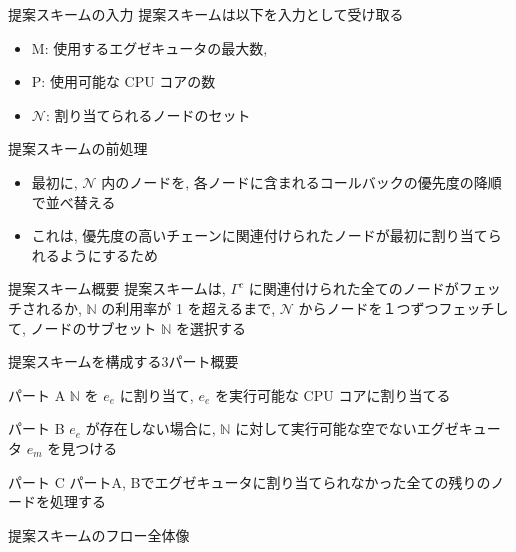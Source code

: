 \begin{frame}{提案スキームの入力}
    提案スキームは以下を入力として受け取る
    \begin{itemize}
        \item $\mathrm{M}$: 使用するエグゼキュータの最大数,
        \item $\mathrm{P}$: 使用可能な CPU コアの数
        \item $\mathcal{N}$: 割り当てられるノードのセット
    \end{itemize}
\end{frame}

\begin{frame}{提案スキームの前処理}
    \begin{itemize}
        \item 最初に, $\mathcal{N}$ 内のノードを, 各ノードに含まれるコールバックの優先度の降順で並べ替える
        \item これは, 優先度の高いチェーンに関連付けられたノードが最初に割り当てられるようにするため
    \end{itemize}
\end{frame}

\begin{frame}{提案スキーム概要}
    提案スキームは, $\Gamma^{c}$ に関連付けられた全てのノードがフェッチされるか, $\mathbb{N}$ の利用率が 1 を超えるまで, $\mathcal{N}$ からノードを１つずつフェッチして, ノードのサブセット $\mathbb{N}$ を選択する
\end{frame}

\begin{frame}{提案スキームを構成する3パート概要}
    \begin{block}{パート A}
        $\mathbb{N}$ を $e_{e}$ に割り当て, $e_{e}$ を実行可能な CPU コアに割り当てる
    \end{block}
    \begin{block}{パート B}
        $e_{e}$ が存在しない場合に, $\mathbb{N}$ に対して実行可能な空でないエグゼキュータ $e_{m}$ を見つける
    \end{block}
    \begin{block}{パート C}
        パートA, Bでエグゼキュータに割り当てられなかった全ての残りのノードを処理する
    \end{block}
\end{frame}

\begin{frame}{提案スキームのフロー全体像}
\end{frame}

